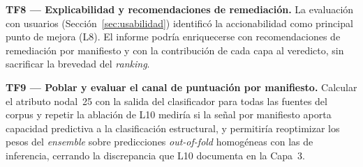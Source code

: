 \textbf{TF8 — Explicabilidad y recomendaciones de remediación.} La evaluación con
usuarios (Sección~\ref{sec:usabilidad}) identificó la accionabilidad como principal
punto de mejora (L8). El informe podría enriquecerse con recomendaciones de
remediación por manifiesto y con la contribución de cada capa al veredicto, sin
sacrificar la brevedad del \textit{ranking}.

\textbf{TF9 — Poblar y evaluar el canal de puntuación por manifiesto.} Calcular el
atributo nodal~25 con la salida del clasificador para todas las fuentes del corpus
y repetir la ablación de L10 mediría si la señal por manifiesto aporta capacidad
predictiva a la clasificación estructural, y permitiría reoptimizar los pesos del
\textit{ensemble} sobre predicciones \textit{out-of-fold} homogéneas con las de
inferencia, cerrando la discrepancia que L10 documenta en la Capa~3.

